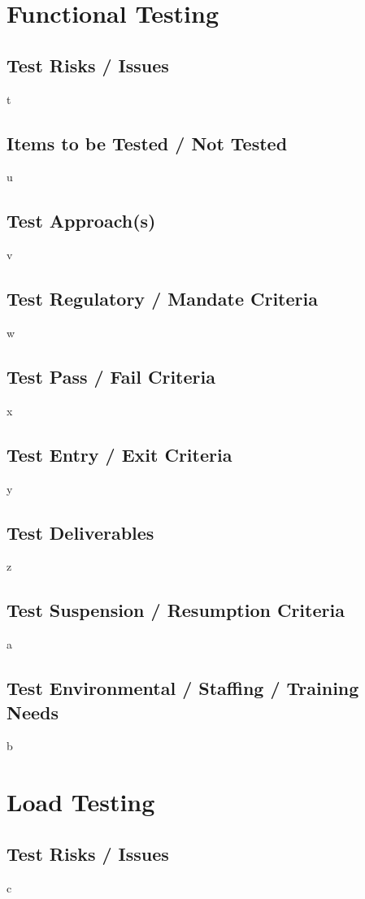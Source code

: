 \documentclass{article}
\begin{document}
\section{Functional Testing}
\subsection{Test Risks / Issues}
t

\subsection{Items to be Tested / Not Tested}
u

\subsection{Test Approach(s)}
v

\subsection{Test Regulatory / Mandate Criteria}
w

\subsection{Test Pass / Fail Criteria}
x

\subsection{Test Entry / Exit Criteria}
y

\subsection{Test Deliverables}
z

\subsection{Test Suspension / Resumption Criteria}
a

\subsection{Test Environmental / Staffing / Training Needs}
b

\section{Load Testing}
\subsection{Test Risks / Issues}
c
\end{document}
